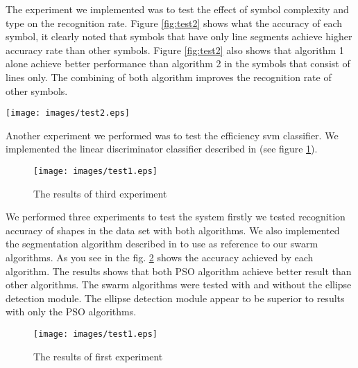 The experiment we implemented was to test the effect of symbol complexity and type on the recognition rate. Figure \ref{fig:test2} shows what the accuracy of each symbol, it clearly noted that symbols that have only line segments achieve higher accuracy rate than other symbols. Figure \ref{fig:test2} also shows that algorithm 1 alone achieve better performance than algorithm 2 in the symbols that consist of lines only. The combining of both algorithm improves the recognition rate of other symbols.  \\
\begin{figure*}[]
	\centering
		\texttt{[image: images/test2.eps]}
	\caption{The results of second experiment}
	\label{fig:test2}
\end{figure*}
 Another experiment we performed was to test the efficiency svm classifier. We implemented the linear discriminator classifier described in \cite{gestureexample12}(see figure \ref{fig:test3}).  %
\begin{figure}[]
	\centering
		\texttt{[image: images/test1.eps]}
	\caption{The results of third experiment}
	\label{fig:test3}
\end{figure}
 
We performed three experiments to test the system firstly we tested recognition accuracy of shapes in the data set with both algorithms. We also implemented the segmentation algorithm described in \cite{earlyprocess} to use as reference to our swarm algorithms.  As you see in the fig. \ref{fig:test1} shows the accuracy achieved by each algorithm. The results shows that both PSO algorithm achieve better result than other algorithms.  The swarm algorithms were tested with and without the ellipse detection module. The ellipse detection module appear to be superior to results with only the PSO algorithms.  \\  
\begin{figure}[]
	\centering
		\texttt{[image: images/test1.eps]}
	\caption{The results of first experiment}
	\label{fig:test1}
\end{figure}
 
